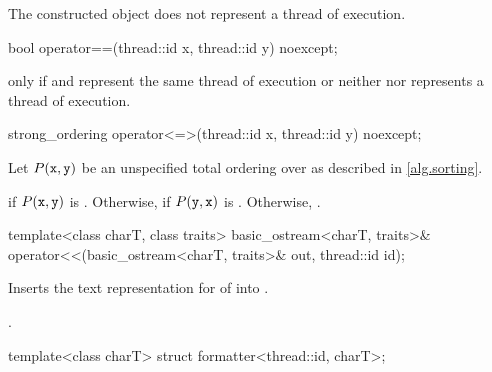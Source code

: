 \begin{itemdescr}
\pnum
\ensures
The constructed object does not represent a thread of execution.
\end{itemdescr}

%
\begin{itemdecl}
bool operator==(thread::id x, thread::id y) noexcept;
\end{itemdecl}

\begin{itemdescr}
\pnum
\returns
{} only if  and  represent the same
thread of execution or neither  nor  represents a thread of
execution.
\end{itemdescr}

%
\begin{itemdecl}
strong_ordering operator<=>(thread::id x, thread::id y) noexcept;
\end{itemdecl}

\begin{itemdescr}
\pnum
Let $P(\tcode{x}, \tcode{y})$ be
an unspecified total ordering over 
as described in \ref{alg.sorting}.

\pnum
\returns
{} if $P(\tcode{x}, \tcode{y})$ is .
Otherwise, 
if $P(\tcode{y}, \tcode{x})$ is .
Otherwise, .
\end{itemdescr}

%
\begin{itemdecl}
template<class charT, class traits>
  basic_ostream<charT, traits>&
    operator<<(basic_ostream<charT, traits>& out, thread::id id);
\end{itemdecl}

\begin{itemdescr}
\pnum
\effects
Inserts the text representation for  of  into
.

\pnum
\returns
{}.
\end{itemdescr}

%
\begin{itemdecl}
template<class charT> struct formatter<thread::id, charT>;
\end{itemdecl}

